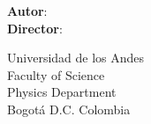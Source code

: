 \begin{titlepage}
\begin{center}
        \large
        \textbf{Autor}: \thesisauthor{} \\
        \large
        \textbf{Director}: \supervisor{}\\
        
        \vspace{3cm}
        
        Universidad de los Andes\\
        Faculty of Science \\
        Physics Department\\
    
        \vspace{2cm}
        Bogotá D.C. Colombia \\
        \@date

    \end{center}
\end{titlepage}
\makeatother